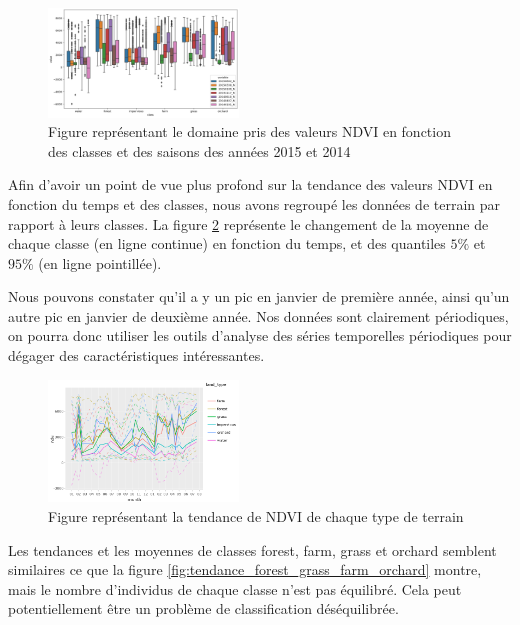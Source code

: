 \documentclass[twocolumn,10pt]{article}
\begin{document}
\begin{figure}[htbp]
\begin{center}
\includegraphics[width=0.45\textwidth]{figures/Analyse_exploratoire/box_plot_season.png}
\caption{\label{fig:season}Figure représentant le domaine pris des valeurs NDVI en fonction des classes et des saisons des années 2015 et 2014}
\end{center}
\end{figure}

Afin d'avoir un point de vue plus profond sur la tendance des valeurs NDVI en fonction du temps et des classes, nous avons regroupé les données de terrain par rapport à leurs classes. La figure \ref{fig:tendance_all} représente le changement de la moyenne de chaque classe (en ligne continue) en fonction du temps, et des quantiles $5\%$ et $95\%$ (en ligne pointillée).

Nous pouvons constater qu'il a y un pic en janvier de première année, ainsi qu'un autre pic en janvier de deuxième année. Nos données sont clairement périodiques, on pourra donc utiliser les outils d'analyse des séries temporelles périodiques pour dégager des caractéristiques intéressantes. 

\begin{figure}[htbp]
	\begin{center}
		\includegraphics[width=0.45\textwidth]{figures/Analyse_exploratoire/tendance_all.png}
		\caption{\label{fig:tendance_all}Figure représentant la tendance de NDVI de chaque type de terrain}
	\end{center}
\end{figure}

Les tendances et les moyennes de classes forest, farm, grass et orchard semblent similaires ce que la figure \ref{fig:tendance_forest_grass_farm_orchard} montre, mais le nombre d'individus de chaque classe n'est pas équilibré. Cela peut potentiellement être un problème de classification déséquilibrée. 
\end{document}
